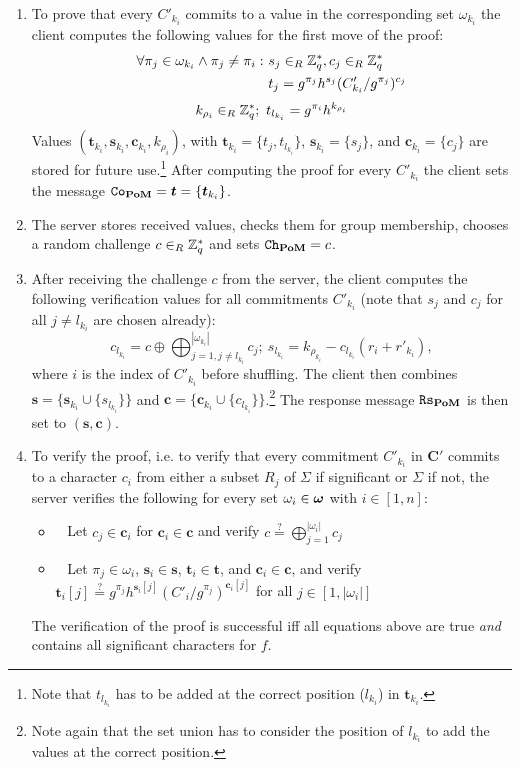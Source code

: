 \begin{enumerate}
  \item To prove that every $C'_{{k_i}}$ commits to a value in the corresponding set $\omega_{{k_i}}$ the client computes the following values for the first move of the proof:
    \begin{align*}
      \forall \pi_j\in\omega_{{k_i}} \wedge \pi_j\not=\pi_i :~& s_j\in_R\mathbb{Z}^\ast_q, c_j\in_R\mathbb{Z}^\ast_q \\
      & t_j=g^{\pi_j}h^{s_j}(C'_{{k_i}}/g^{\pi_j})^{c_j}
    \end{align*}
    \[
      k_{\rho_i}\in_R\mathbb{Z}^\ast_q;~ t_{l_{k_i}}=g^{\pi_i}h^{k_{\rho_i}}
    \]
    Values $(\bm t_{k_i}, \bm s_{k_i}, \bm c_{k_i}, k_{\rho_i})$, with $\bm t_{k_i}=\{t_j, t_{l_{k_i}}\}$, $\bm s_{k_i}=\{s_j\}$, and $\bm c_{k_i}=\{c_j\}$ are stored for future use.\footnote{Note that $t_{l_{k_i}}$ has to be added at the correct position ($l_{k_i}$) in $\bm t_{k_i}$.}
    After computing the proof for every $C'_{k_i}$ the client sets the message $\mathtt{Co}_\mathsf{\bf PoM}=\bm t = \{\bm t_{k_i}\}$.
    
  \item The server stores received values, checks them for group membership, chooses a random challenge $c\in_R\mathbb{Z}^\ast_q$ and sets $\mathtt{Ch}_\mathsf{\bf PoM}=c$.
  
  \item After receiving the challenge $c$ from the server, the client computes the following verification values for all commitments $C'_{{k_i}}$ (note that $s_j$ and $c_j$ for all $j\not= l_{k_i}$ are chosen already):
    \[
      c_{l_{k_i}}=c\oplus \bigoplus_{j=1,j\not=l_{k_i}}^{|\omega_{k_i}|} c_j;~ s_{l_{k_i}}=k_{\rho_{k_i}} - c_{l_{k_i}}(r_{i}+r'_{k_i}),
    \]
    where $i$ is the index of $C'_{k_i}$ before shuffling.
    The client then combines $\bm s = \{\bm s_{k_i} \cup \{s_{l_{k_i}}\}\}$ and $\bm c = \{\bm c_{k_i} \cup \{c_{l_{k_i}}\}\}$.\footnote{Note again that the set union has to consider the position of $l_{k_i}$ to add the values at the correct position.}
    The response message $\mathtt{Rs}_\mathsf{\bf PoM}$ is then set to $(\bm s, \bm c)$.
  
  \item To verify the proof, i.e. to verify that every commitment $C'_{k_i}$ in $\bm C'$ commits to a character $c_i$ from either a subset $R_j$ of $\Sigma$ if significant or $\Sigma$ if not, the server verifies the following for every set $\omega_{i} \in \boldsymbol{\mathbf{\omega}}$ with $i\in[1,n]$: %
    \begin{itemize}
      \item~ Let $c_j\in\bm c_i$ for $\bm c_i\in\bm c$ and verify
            $c\stackrel{?}{=}\bigoplus_{j=1}^{|\omega_i|}c_j$
      \item~ Let $\pi_j\in\omega_{i}$, $\bm s_i \in \bm s$, $\bm t_i\in \bm t$, and $\bm c_i \in \bm c$, and verify
            $\displaystyle \bm t_{i}[j]\stackrel{?}{=}g^{\pi_j}h^{\bm s_i[j]}(C'_i/g^{\pi_j})^{\bm c_i[j]}$
            for all $j\in[1,|\omega_{i}|]$
    \end{itemize}
    The verification of the proof is successful iff all equations above are true \emph{and} \vect{\omega} contains all significant characters for $f$.
\end{enumerate}

